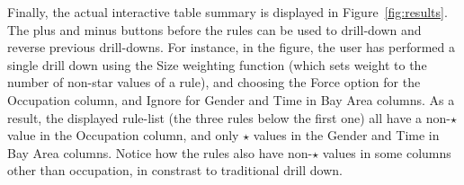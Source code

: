 Finally, the actual interactive table summary is displayed in Figure~\ref{fig:results}. The plus and minus buttons before the rules can be used to drill-down and reverse previous drill-downs. For instance, in the figure, the user has performed a single drill down using the Size weighting function (which sets weight to the number of non-star values of a rule), and choosing the Force option for the Occupation column, and Ignore for Gender and Time in Bay Area columns. As a result, the displayed rule-list (the three rules below the first one) all have a non-$\star$ value in the Occupation column, and only $\star$ values in the Gender and Time in Bay Area columns. Notice how the rules also have non-$\star$ values in some columns other than occupation, in constrast to traditional drill down.